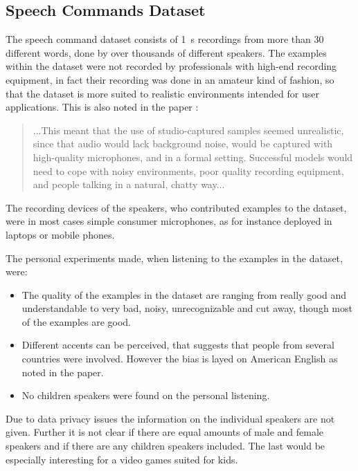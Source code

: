 \subsection{Speech Commands Dataset}\label{sec:exp_dataset_speech_cmd}
The speech command dataset \cite{Warden2018} consists of \SI{1}{\second} recordings from more than 30 different words, done by over thousands of different speakers.
The examples within the dataset were not recorded by professionals with high-end recording equipment, in fact their recording was done in an amateur kind of fashion, so that the dataset is more suited to realistic environments intended for user applications.
This is also noted in the paper \cite{Warden2018}:
\begin{quote}
...This meant that the use of studio-captured samples seemed unrealistic, since that audio would lack background noise, would be captured with high-quality microphones, and in a formal setting. 
Successful models would need to cope with noisy environments, poor quality recording equipment, and people talking in a natural, chatty way...
\end{quote}
The recording devices of the speakers, who contributed examples to the dataset, were in most cases simple consumer microphones, as for instance deployed in laptops or mobile phones.

The personal experiments made, when listening to the examples in the dataset, were:
\begin{itemize}
  \item The quality of the examples in the dataset are ranging from really good and understandable to very bad, noisy, unrecognizable and cut away, though most of the examples are good.

  \item Different accents can be perceived, that suggests that people from several countries were involved. However the bias is layed on American English as noted in the paper.

  \item No children speakers were found on the personal listening.
\end{itemize}

Due to data privacy issues the information on the individual speakers are not given.
Further it is not clear if there are equal amounts of male and female speakers and if there are any children speakers included.
The last would be especially interesting for a video games suited for kids.

